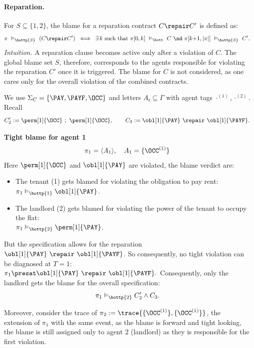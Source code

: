 \paragraph{Reparation.}
For \(S\subseteq\{1,2\}\), the blame for a reparation contract \(C\repair C'\) is defined as:
\[
\pi\ \vDash_{\bottp{S}}\ (C\repair C')
\;\iff\;
\exists\,k\ \text{such that}\ 
\pi[0,k]\ \vDash_{\bott}\ C
\ \nd\
\pi[k{+}1,|\pi|]\ \vDash_{\bottp{S}}\ C'.
\]
\emph{Intuition.}  A reparation clause becomes active only after a violation of \(C\). The global blame set \(S\), therefore, corresponds to the agents responsible for violating the reparation \(C'\) once it is triggered. The blame for $C$ is not considered, as one cares only for the overall violation of the combined contracts.


\begin{example}
We use $\Sigma_C=\{\PAY,\PAYF,\OCC\}$ and letters $A_t\subseteq\Gamma$ with agent tags $\cdot^{(1)},\cdot^{(2)}$.
Recall
\[
C_2' := \perm[1]{\OCC}\ ;\ \perm[1]{\OCC},\qquad
C_3 := \obl[1]{\PAY}\ \repair\ \obl[1]{\PAYF}.
\]


\medskip
\noindent\textbf{Tight blame for agent 1 }
\[
\pi_1=\langle A_1\rangle,\quad A_1=\{\OCC^{(1)}\}
\]
Here $\perm[1]{\OCC}$ and $ \obl[1]{\PAY}$ are violated, the blame verdict are:
\begin{itemize}
\item The tenant (1) gets blamed for violating the obligation to pay rent:\\ $\pi_1 \vDash_{\bottp{1}} \obl[1]{\PAY}$. 
\item The landlord (2) gets blamed for violating the power of the tenant to occupy the flat:\\
$\pi_1 \vDash_{\bottp{2}} \perm[1]{\PAY}$.
\end{itemize}
But the specification allows for the reparation $\obl[1]{\PAY}\ \repair\ \obl[1]{\PAYF}$. So consequently, no tight violation can be diagnosed at $T=1$:\\
$\pi_1 \presat \obl[1]{\PAY}\ \repair\ \obl[1]{\PAYF}.$
Consequently, only the landlord gets the blame for the overall specification:
\[\pi_1 \vDash_{\bottp{2}} C_2' \wedge C_3.\]

Moreover, consider the trace of  $\pi_2:= \trace{\{\OCC^{(1)}\}, \{\OCC^{(1)}\}}$, the extension of $\pi_1$ with the same event, as the blame is forward and tight looking, the blame is still assigned only to agent $2$ (landlord) as they is responsible for the first violation.


\end{example}
